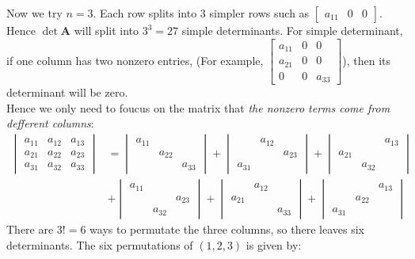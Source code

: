 \begin{example}
Now we try $n=3$. Each row splits into 3 simpler rows such as $\begin{bmatrix}
a_{11}&0&0
\end{bmatrix}$. Hence $\det\bm A$ will split into $3^3=27$ simple determinants. For simple determinant, if one column has two nonzero entries, (For example, $\begin{bmatrix}
a_{11}&0&0\\a_{21}&0&0\\0&0&a_{33}
\end{bmatrix}$), then its determinant will be zero.\\
Hence we only need to foucus on the matrix that \emph{the nonzero terms come from defferent columns}:
\[
\begin{aligned}
\begin{vmatrix}
a_{11}&a_{12}&a_{13}\\a_{21}&a_{22}&a_{23}\\a_{31}&a_{32}&a_{33}
\end{vmatrix}
&=
\begin{vmatrix}
a_{11}&&\\&a_{22}&\\&&a_{33}
\end{vmatrix}
+
\begin{vmatrix}
&a_{12}&\\&&a_{23}\\a_{31}&&
\end{vmatrix}
+
\begin{vmatrix}
&&a_{13}\\a_{21}&&\\&a_{32}&
\end{vmatrix}\\&+
\begin{vmatrix}
a_{11}&&\\&&a_{23}\\&a_{32}&
\end{vmatrix}
+
\begin{vmatrix}
&a_{12}&\\a_{21}&&\\&&a_{33}
\end{vmatrix}
+
\begin{vmatrix}
&&a_{13}\\&a_{22}&\\a_{31}&&
\end{vmatrix}
\end{aligned}
\]
There are $3!=6$ ways to permutate the three columns, so there leaves six determinants. The six permutations of $(1,2,3)$ is given by:

\end{example}
